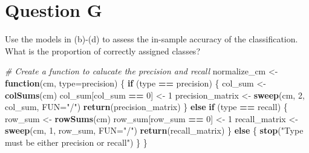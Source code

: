 \documentclass[
]{article}
\newenvironment{Shaded}{\begin{snugshade}}{\end{snugshade}}
\newcommand{\AttributeTok}[1]{\textcolor[rgb]{0.13,0.29,0.53}{#1}}
\newcommand{\CommentTok}[1]{\textcolor[rgb]{0.56,0.35,0.01}{\textit{#1}}}
\newcommand{\ControlFlowTok}[1]{\textcolor[rgb]{0.13,0.29,0.53}{\textbf{#1}}}
\newcommand{\DecValTok}[1]{\textcolor[rgb]{0.00,0.00,0.81}{#1}}
\newcommand{\FunctionTok}[1]{\textcolor[rgb]{0.13,0.29,0.53}{\textbf{#1}}}
\newcommand{\NormalTok}[1]{#1}
\newcommand{\OtherTok}[1]{\textcolor[rgb]{0.56,0.35,0.01}{#1}}
\newcommand{\SpecialCharTok}[1]{\textcolor[rgb]{0.81,0.36,0.00}{\textbf{#1}}}
\newcommand{\StringTok}[1]{\textcolor[rgb]{0.31,0.60,0.02}{#1}}
\begin{document}
\hypertarget{question-g}{%
\section{Question G}\label{question-g}}

Use the models in (b)-(d) to assess the in-sample accuracy of the
classification. What is the proportion of correctly assigned classes?

\begin{Shaded}
\begin{Highlighting}[]
\CommentTok{\# Create a function to calucate the precision and recall}
\NormalTok{normalize\_cm }\OtherTok{\textless{}{-}} \ControlFlowTok{function}\NormalTok{(cm, }\AttributeTok{type=}\StringTok{\textquotesingle{}precision\textquotesingle{}}\NormalTok{) \{}
  \ControlFlowTok{if}\NormalTok{ (type }\SpecialCharTok{==} \StringTok{\textquotesingle{}precision\textquotesingle{}}\NormalTok{) \{}
\NormalTok{    col\_sum }\OtherTok{\textless{}{-}} \FunctionTok{colSums}\NormalTok{(cm)}
\NormalTok{    col\_sum[col\_sum }\SpecialCharTok{==} \DecValTok{0}\NormalTok{] }\OtherTok{\textless{}{-}} \DecValTok{1}
\NormalTok{    precision\_matrix }\OtherTok{\textless{}{-}} \FunctionTok{sweep}\NormalTok{(cm, }\DecValTok{2}\NormalTok{, col\_sum, }\AttributeTok{FUN=}\StringTok{"/"}\NormalTok{)}
    \FunctionTok{return}\NormalTok{(precision\_matrix)}
\NormalTok{  \} }\ControlFlowTok{else} \ControlFlowTok{if}\NormalTok{ (type }\SpecialCharTok{==} \StringTok{\textquotesingle{}recall\textquotesingle{}}\NormalTok{) \{}
\NormalTok{    row\_sum }\OtherTok{\textless{}{-}} \FunctionTok{rowSums}\NormalTok{(cm)}
\NormalTok{    row\_sum[row\_sum }\SpecialCharTok{==} \DecValTok{0}\NormalTok{] }\OtherTok{\textless{}{-}} \DecValTok{1}
\NormalTok{    recall\_matrix }\OtherTok{\textless{}{-}} \FunctionTok{sweep}\NormalTok{(cm, }\DecValTok{1}\NormalTok{, row\_sum, }\AttributeTok{FUN=}\StringTok{"/"}\NormalTok{)}
    \FunctionTok{return}\NormalTok{(recall\_matrix)}
\NormalTok{  \} }\ControlFlowTok{else}\NormalTok{ \{}
    \FunctionTok{stop}\NormalTok{(}\StringTok{"Type must be either \textquotesingle{}precision\textquotesingle{} or \textquotesingle{}recall\textquotesingle{}"}\NormalTok{)}
\NormalTok{  \}}
\NormalTok{\}}
\end{Highlighting}
\end{Shaded}
\end{document}
